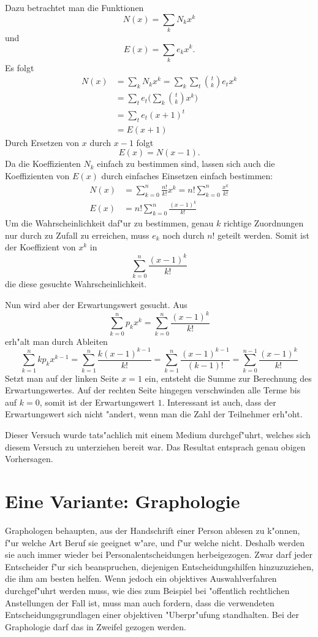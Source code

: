 Dazu betrachtet man die Funktionen
$$N(x)=\sum_{k}N_kx^k$$
und 
$$E(x)=\sum_{k}e_kx^k.$$
Es folgt
\begin{align*}
N(x)&=\sum_kN_kx^k=\sum_k\sum_t\binom{t}{k}e_tx^k\\
&=\sum_te_t\biggl(\sum_k\binom{t}{k}x^k\biggr)\\
&=\sum_te_t(x+1)^t\\
&=E(x+1)
\end{align*}
Durch Ersetzen von $x$ durch $x-1$ folgt
$$E(x)=N(x-1).$$
Da die Koeffizienten $N_k$ einfach zu bestimmen sind, lassen sich auch
die Koeffizienten von $E(x)$ durch einfaches Einsetzen einfach
bestimmen:
\begin{align*}
N(x)&=\sum_{k=0}^n\frac{n!}{k!}x^k=n!\sum_{k=0}^n\frac{x^k}{k!}\\
E(x)&=n!\sum_{k=0}^n\frac{(x-1)^k}{k!}
\end{align*}
Um die Wahrscheinlichkeit daf"ur zu bestimmen, genau $k$ richtige Zuordnungen nur
durch zu Zufall zu erreichen, muss $e_k$ noch durch $n!$ geteilt werden.
Somit
ist der Koeffizient von $x^k$ in
$$\sum_{k=0}^n\frac{(x-1)^k}{k!}$$
die diese gesuchte Wahrscheinlichkeit.

Nun wird aber der Erwartungswert gesucht.
Aus
$$\sum_{k=0}^np_kx^k=\sum_{k=0}^n\frac{(x-1)^k}{k!}$$
erh"alt man durch Ableiten
$$
\sum_{k=1}^nkp_kx^{k-1}
=\sum_{k=1}^n\frac{k(x-1)^{k-1}}{k!}
=\sum_{k=1}^n\frac{(x-1)^{k-1}}{(k-1)!}
=\sum_{k=0}^{n-1}\frac{(x-1)^k}{k!}
$$
Setzt man auf der linken Seite $x=1$ ein, entsteht die Summe zur
Berechnung des Erwartungswertes.
Auf der rechten Seite hingegen
verschwinden alle Terme bis auf $k=0$, somit ist der Erwartungswert
$1$.
Interessant ist auch, dass der Erwartungswert sich nicht "andert,
wenn man die Zahl der Teilnehmer erh"oht.

Dieser Versuch wurde tats"achlich mit einem Medium durchgef"uhrt, welches
sich diesem Versuch zu unterziehen bereit war.
Das Resultat entsprach genau
obigen Vorhersagen.

\section{Eine Variante: Graphologie}
Graphologen behaupten, aus der Handschrift einer Person ablesen zu k"onnen,
f"ur welche Art Beruf sie geeignet w"are, und f"ur welche nicht.
Deshalb
werden sie auch immer wieder bei Personalentscheidungen herbeigezogen.
Zwar darf jeder Entscheider f"ur sich beanspruchen, diejenigen Entscheidungshilfen
hinzuzuziehen, die ihm am besten helfen.
Wenn jedoch ein objektives
Auswahlverfahren durchgef"uhrt werden muss, wie dies zum Beispiel bei
"offentlich rechtlichen Anstellungen der Fall ist, muss man auch
fordern, dass die verwendeten Entscheidungsgrundlagen einer objektiven
"Uberpr"ufung standhalten.
Bei der Graphologie darf das in Zweifel
gezogen werden.

